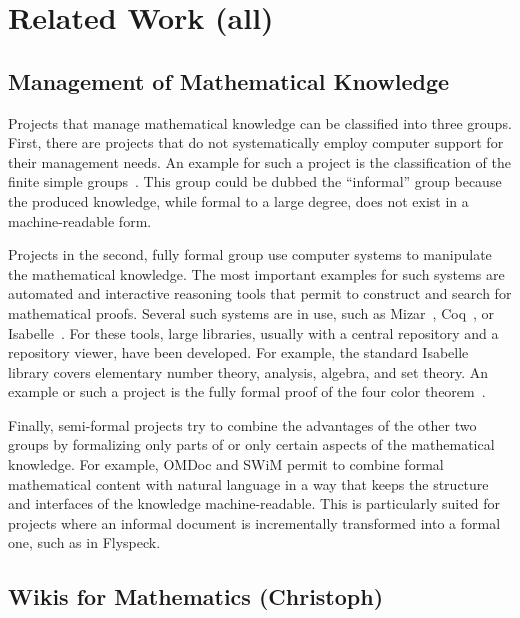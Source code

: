 \section{Related Work (all)}
\label{sec:related}


\subsection{Management of Mathematical Knowledge}
\label{sec:mkm}

Projects that manage mathematical knowledge can be classified into three groups.  First, there are projects that do not systematically employ computer support for their management needs.  An example for such a project is the classification of the finite simple groups~\cite{Gorenstein-Lyons-Salomon:1994}.  This group could be dubbed the ``informal'' group because the produced knowledge, while formal to a large degree, does not exist in a machine-readable form.

Projects in the second, fully formal group use computer systems to manipulate the mathematical knowledge.  The most important examples for such systems are automated and interactive reasoning tools that permit to construct and search for mathematical proofs. Several such systems are in use, such as Mizar~\cite{mizarmanual}, Coq~\cite{Coq}, or Isabelle~\cite{Isabelle:definition}.  For these tools, large libraries, usually with a central repository and a repository viewer, have been developed.  For example, the standard Isabelle library covers elementary number theory, analysis, algebra, and set theory.  An example or such a project is the fully formal proof of the four color theorem~\cite{Gonthier:FourColor}.

Finally, semi-formal projects try to combine the advantages of the other two groups by formalizing only parts of or only certain aspects of the mathematical knowledge.  For example, OMDoc and SWiM permit to combine formal mathematical content with natural language in a way that keeps the structure and interfaces of the knowledge machine-readable.  This is particularly suited for projects where an informal document is incrementally transformed into a formal one, such as in Flyspeck.

\subsection{Wikis for Mathematics (Christoph)}
\label{sec:math-wiki}

